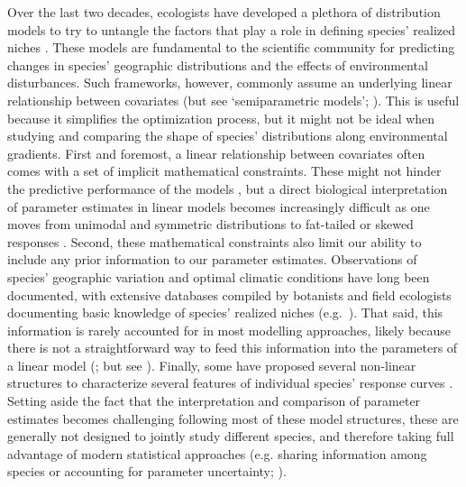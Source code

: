 \documentclass[11pt, a4paper]{article}
\begin{document}
Over the last two decades, ecologists have developed a plethora of distribution models to try to untangle the factors that play a role in defining species' realized niches \citep{guisanPredictiveHabitatDistribution2000, zurellEcologicalNicheModeling2019}. These models are fundamental to the scientific community for predicting changes in species' geographic distributions and the effects of environmental disturbances. Such frameworks, however, commonly assume an underlying linear relationship between covariates (but see `semiparametric models'; \citealt{norbergComprehensiveEvaluationPredictive2019}). This is useful because it simplifies the optimization process, but it might not be ideal when studying and comparing the shape of species' distributions along environmental gradients. First and foremost, a linear relationship between covariates often comes with a set of implicit mathematical constraints. These might not hinder the predictive performance of the models \citep{norbergComprehensiveEvaluationPredictive2019}, but a direct biological interpretation of parameter estimates in linear models becomes increasingly difficult as one moves from unimodal and symmetric distributions \citep{terbraakWeightedAveragingLogistic1986, jamilGeneralizedLinearMixed2013} to fat-tailed or skewed responses \citep{huismanHierarchicalSetModels1993}. Second, these mathematical constraints also limit our ability to include any prior information to our parameter estimates. Observations of species' geographic variation and optimal climatic conditions have long been documented, with extensive databases compiled by botanists and field ecologists documenting basic knowledge of species' realized niches (e.g.~\citealt{landoltFloraIndicativaOkologische2010}). That said, this information is rarely accounted for in most modelling approaches, likely because there is not a straightforward way to feed this information into the parameters of a linear model (\citealt{scherrerEcologicalIndicatorValues2019}; but see \citealt{terbraakWeightedAveragingLogistic1986, ovaskainenHowMakeMore2017}). Finally, some have proposed several non-linear structures to characterize several features of individual species' response curves \citep{huismanHierarchicalSetModels1993}. Setting aside the fact that the interpretation and comparison of parameter estimates becomes challenging following most of these model structures, these are generally not designed to jointly study different species, and therefore taking full advantage of modern statistical approaches (e.g. sharing information among species or accounting for parameter uncertainty; \citealt{evansProcessbasedRangeModeling2016}).
\end{document}
